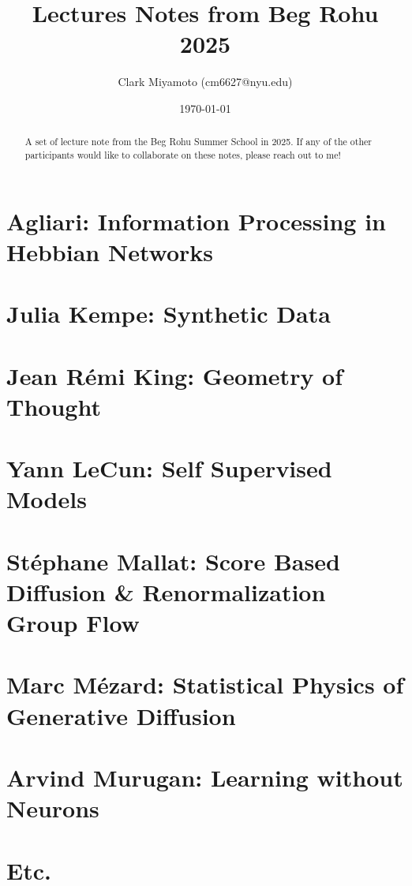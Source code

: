 \documentclass[12pt,fleqn]{article}
\title{Lectures Notes from Beg Rohu 2025}
\author{Clark Miyamoto (cm6627@nyu.edu)}
\date{\today}
\numberwithin{equation}{section} %
\begin{document}
\maketitle
\begin{abstract}
	A set of lecture note from the Beg Rohu Summer School in 2025. If any of the other participants would like to collaborate on these notes, please reach out to me!
\end{abstract}

\tableofcontents
\newpage

\part{Agliari: Information Processing in Hebbian Networks}

\newpage

\part{Julia Kempe: Synthetic Data}

\newpage

\part{Jean R\'emi King: Geometry of Thought}

\newpage

\part{Yann LeCun: Self Supervised Models}

\newpage

\part{St\'ephane Mallat: Score Based Diffusion \& Renormalization Group Flow}

\newpage

\part{Marc M\'ezard: Statistical Physics of Generative Diffusion}

\newpage

\part{Arvind Murugan: Learning without Neurons}

\newpage

\part{Etc.}
\end{document}
